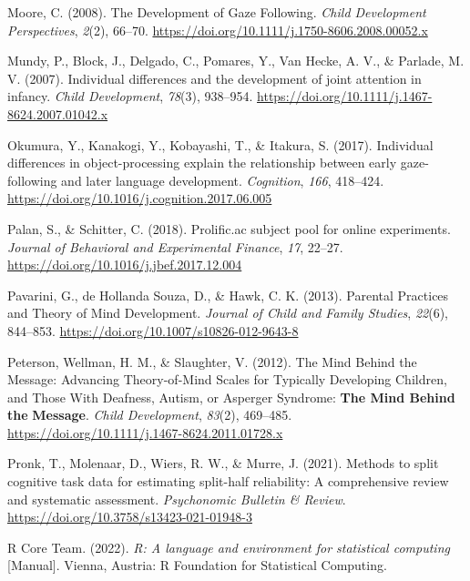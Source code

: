 \documentclass[
  man,floatsintext]{apa6}
\newlength{\cslhangindent}
\newlength{\cslentryspacingunit} %
\newenvironment{CSLReferences}[2] %
 {%
  \setlength{\parindent}{0pt}
  \ifodd #1
  \let\oldpar\par
  \def\par{\hangindent=\cslhangindent\oldpar}
  \fi
  \setlength{\parskip}{#2\cslentryspacingunit}
 }%
 {}
\begin{document}
\begin{CSLReferences}{1}{0}
\leavevmode{}%
Moore, C. (2008). The {Development} of {Gaze Following}. \emph{Child Development Perspectives}, \emph{2}(2), 66--70. \url{https://doi.org/10.1111/j.1750-8606.2008.00052.x}

\leavevmode{}%
Mundy, P., Block, J., Delgado, C., Pomares, Y., Van Hecke, A. V., \& Parlade, M. V. (2007). Individual differences and the development of joint attention in infancy. \emph{Child Development}, \emph{78}(3), 938--954. \url{https://doi.org/10.1111/j.1467-8624.2007.01042.x}

\leavevmode{}%
Okumura, Y., Kanakogi, Y., Kobayashi, T., \& Itakura, S. (2017). Individual differences in object-processing explain the relationship between early gaze-following and later language development. \emph{Cognition}, \emph{166}, 418--424. \url{https://doi.org/10.1016/j.cognition.2017.06.005}

\leavevmode{}%
Palan, S., \& Schitter, C. (2018). Prolific.ac subject pool for online experiments. \emph{Journal of Behavioral and Experimental Finance}, \emph{17}, 22--27. \url{https://doi.org/10.1016/j.jbef.2017.12.004}

\leavevmode{}%
Pavarini, G., de Hollanda Souza, D., \& Hawk, C. K. (2013). Parental {Practices} and {Theory} of {Mind Development}. \emph{Journal of Child and Family Studies}, \emph{22}(6), 844--853. \url{https://doi.org/10.1007/s10826-012-9643-8}

\leavevmode{}%
Peterson, Wellman, H. M., \& Slaughter, V. (2012). The {Mind Behind} the {Message}: {Advancing Theory-of-Mind Scales} for {Typically Developing Children}, and {Those With Deafness}, {Autism}, or {Asperger Syndrome}: {\textbf{The Mind Behind}}{ \textbf{the} }{\textbf{Message}}. \emph{Child Development}, \emph{83}(2), 469--485. \url{https://doi.org/10.1111/j.1467-8624.2011.01728.x}

\leavevmode{}%
Pronk, T., Molenaar, D., Wiers, R. W., \& Murre, J. (2021). Methods to split cognitive task data for estimating split-half reliability: {A} comprehensive review and systematic assessment. \emph{Psychonomic Bulletin \& Review}. \url{https://doi.org/10.3758/s13423-021-01948-3}

\leavevmode{}%
R Core Team. (2022). \emph{R: {A} language and environment for statistical computing} {[}Manual{]}. {Vienna, Austria}: {R Foundation for Statistical Computing}.


\end{CSLReferences}
\end{document}
